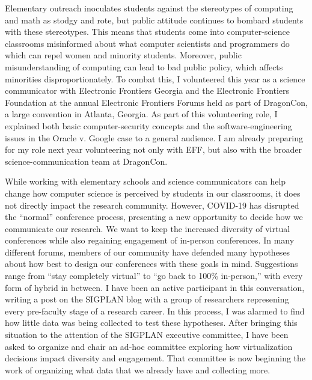\documentclass{article}
\theoremstyle{definition}
\begin{document}
Elementary outreach inoculates students against the stereotypes of computing and math as stodgy and rote, but public attitude continues to bombard students with these stereotypes.
This means that students come into computer-science classrooms misinformed about what computer scientists and programmers do which can repel women and minority students.
Moreover, public misunderstanding of computing can lead to bad public policy, which affects minorities disproportionately.
To combat this, I volunteered this year as a science communicator with Electronic Frontiers Georgia and the Electronic Frontiers Foundation at the annual Electronic Frontiers Forums held as part of DragonCon, a large convention in Atlanta, Georgia.
As part of this volunteering role, I explained both basic computer-security concepts and the software-engineering issues in the Oracle v. Google case to a general audience.
I am already preparing for my role next year volunteering not only with EFF, but also with the broader science-communication team at DragonCon.

While working with elementary schools and science communicators can help change how computer science is perceived by students in our classrooms, it does not directly impact the research community.
However, COVID-19 has disrupted the ``normal'' conference process, presenting a new opportunity to decide how we communicate our research.
We want to keep the increased diversity of virtual conferences while also regaining engagement of in-person conferences.
In many different forums, members of our community have defended many hypotheses about how best to design our conferences with these goals in mind.
Suggestions range from ``stay completely virtual'' to ``go back to 100\% in-person,'' with every form of hybrid in between.
I have been an active participant in this conversation, writing a post on the SIGPLAN blog with a group of researchers represening every pre-faculty stage of a research career.
In this process, I was alarmed to find how little data was being collected to test these hypotheses.
After bringing this situation to the attention of the SIGPLAN executive committee, I have been asked to organize and chair an ad-hoc committee exploring how virtualization decisions impact diversity and engagement.
That committee is now beginning the work of organizing what data that we already have and collecting more.
\end{document}
